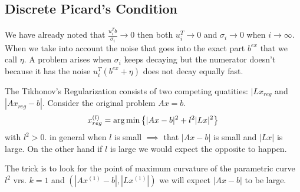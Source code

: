 \subsection{Discrete Picard's Condition}
We have already noted that $\frac{u_i^T b}{\sigma_i} \to 0$ then both $u_i^T\to 0$ and $\sigma_i\to 0$ when $i\to \infty$. \\
When we take into account the noise that goes into the exact part $b^{ex}$ that we call $\eta$. A problem arises when $\sigma_i$ keeps decaying but the numerator doesn't because it has the noise $u_i^T(b^{ex} + \eta)$ does not decay equally fast.

The Tikhonov's Regularization consists of two competing quatities: $|Lx_{reg}$ and $|Ax_{reg}-b|$. Consider the original problem $Ax=b$.
$$x_{reg}^{(l)} = \operatorname*{arg\,min} \left\{ |Ax-b|^2 + l^2|Lx|^2 \right\} $$
with $l^2>0$. in general when $l$ is small $\implies$ that $|Ax-b|$ is small and $|Lx|$ is large. On the other hand if $l$ is large we would expect the opposite to happen.
\begin{center}
\end{center}

The trick is to look for the point of maximum curvature of the parametric curve $l^2$ vrs. $k=1$ and $(|Ax^{(1)} - b |, |Lx^{(1)}|)$ we will expect $|Ax-b|$ to be large.
